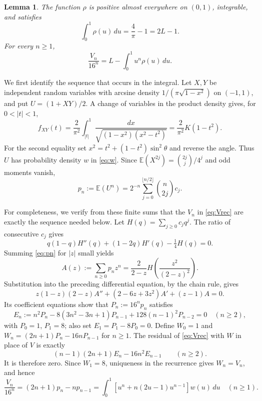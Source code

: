 \documentclass[11pt]{article}
\newtheorem{lemma}{Lemma}
\newcommand{\E}{\mathbb E}
\begin{document}
\begin{lemma}\label{lem:moment}
The function $\rho$ is positive almost everywhere on $(0,1)$, integrable,
and satisfies
\begin{equation}\label{eq:mass}
 \int_0^1\rho(u)\,du=\frac4\pi-1=2L-1.
\end{equation}
For every $n\geq1$,
\begin{equation}\label{eq:moment}
 \frac{V_n}{16^n}=L-\int_0^1u^n\rho(u)\,du.
\end{equation}
\end{lemma}

We first identify the sequence that occurs in the integral. Let $X,Y$
be independent random variables with arcsine density
$1/(\pi\sqrt{1-x^2})$ on $(-1,1)$, and put $U=(1+XY)/2$.
A change of variables in the product density gives, for $0<|t|<1$,
\[
 f_{XY}(t)=\frac2{\pi^2}\int_{|t|}^1
 \frac{dx}{\sqrt{(1-x^2)(x^2-t^2)}}
 =\frac2{\pi^2}K(1-t^2).
\]
For the second equality set
$x^2=t^2+(1-t^2)\sin^2\theta$ and reverse the angle.
Thus $U$ has probability density $w$ in \eqref{eq:w}.
Since $\E(X^{2j})=\binom{2j}j/4^j$ and odd moments vanish,
\begin{equation}\label{eq:pn}
 p_n:=\E(U^n)=2^{-n}\sum_{j=0}^{\lfloor n/2\rfloor}\binom n{2j}c_j.
\end{equation}

For completeness, we verify from these finite sums that the $V_n$
in \eqref{eq:Vrec} are exactly the sequence needed below.
Let $H(q)=\sum_{j\geq0}c_jq^j$. The ratio of consecutive $c_j$ gives
\[
 q(1-q)H''(q)+(1-2q)H'(q)-\tfrac14H(q)=0.
\]
Summing \eqref{eq:pn} for $|z|$ small yields
\[
 A(z):=\sum_{n\geq0}p_nz^n
   =\frac2{2-z}H\left(\frac{z^2}{(2-z)^2}\right).
\]
Substitution into the preceding differential equation, by the chain
rule, gives
\[
 z(1-z)(2-z)A''+(2-6z+3z^2)A'+(z-1)A=0.
\]
Its coefficient equations show that $P_n:=16^np_n$ satisfies
\[
 E_n:=n^2P_n-8(3n^2-3n+1)P_{n-1}+128(n-1)^2P_{n-2}=0
 \quad(n\geq2),
\]
with $P_0=1$, $P_1=8$; also set $E_1=P_1-8P_0=0$.
Define $W_0=1$ and $W_n=(2n+1)P_n-16nP_{n-1}$ for $n\geq1$.
The residual of \eqref{eq:Vrec} with $W$ in place of $V$ is exactly
\[
 (n-1)(2n+1)E_n-16n^2E_{n-1}\qquad(n\geq2).
\]
It is therefore zero. Since $W_1=8$, uniqueness in the recurrence gives
$W_n=V_n$, and hence
\begin{equation}\label{eq:weighted}
 \frac{V_n}{16^n}=(2n+1)p_n-np_{n-1}
 =\int_0^1\left[u^n+n(2u-1)u^{n-1}\right]w(u)\,du
 \quad(n\geq1).
\end{equation}
\end{document}
